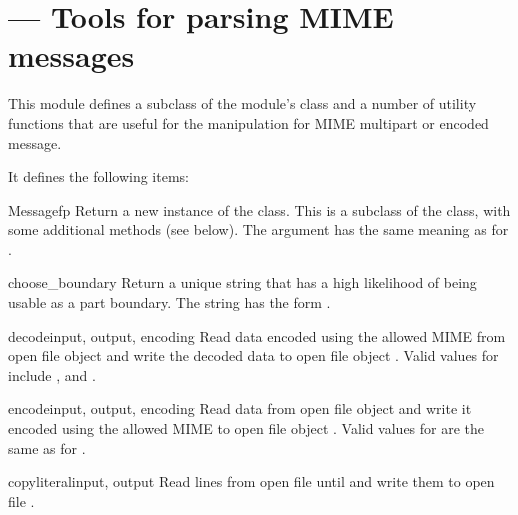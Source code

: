 \section{ ---
         Tools for parsing MIME messages}



This module defines a subclass of the
 module's
 class and a number of utility functions that are
useful for the manipulation for MIME multipart or encoded message.

It defines the following items:

\begin{classdesc}{Message}{fp}
Return a new instance of the  class.  This is a
subclass of the  class, with some additional
methods (see below).  The  argument has the same meaning
as for .
\end{classdesc}

\begin{funcdesc}{choose_boundary}{}
Return a unique string that has a high likelihood of being usable as a
part boundary.  The string has the form
.
\end{funcdesc}

\begin{funcdesc}{decode}{input, output, encoding}
Read data encoded using the allowed MIME  from open file
object  and write the decoded data to open file object
.  Valid values for  include
,  and .
\end{funcdesc}

\begin{funcdesc}{encode}{input, output, encoding}
Read data from open file object  and write it encoded using
the allowed MIME  to open file object .
Valid values for  are the same as for .
\end{funcdesc}

\begin{funcdesc}{copyliteral}{input, output}
Read lines from open file  until \EOF{} and write them to
open file .
\end{funcdesc}

